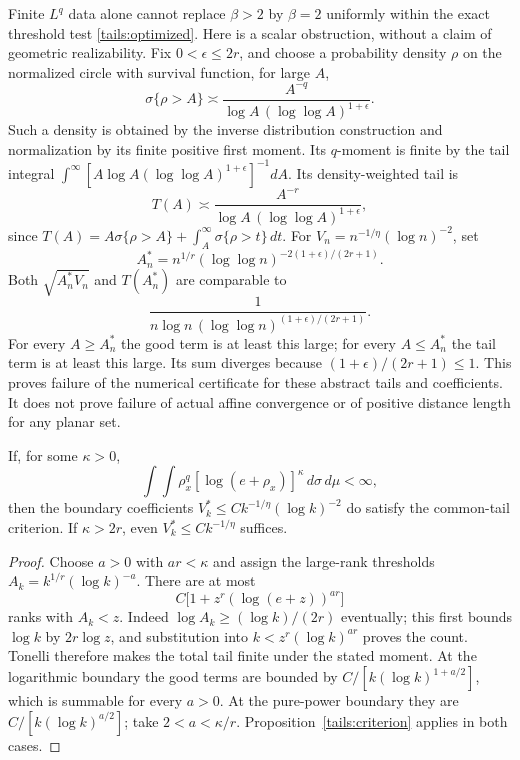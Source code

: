 \begin{remark}
\label{tails:boundary}
Finite \(L^q\) data alone cannot replace \(\beta>2\) by
\(\beta=2\) uniformly within the exact threshold test
\eqref{tails:optimized}. Here is a scalar obstruction, without a
claim of geometric realizability. Fix \(0<\epsilon\leq2r\), and
choose a probability density \(\rho\) on the normalized circle with
survival function, for large \(A\),
$$
\sigma\{\rho>A\}\asymp
\frac{A^{-q}}{\log A\,(\log\log A)^{1+\epsilon}}.
$$
Such a density is obtained by the inverse distribution construction
and normalization by its finite positive first moment. Its
\(q\)-moment is finite by the tail integral
\(\int^\infty [A\log A(\log\log A)^{1+\epsilon}]^{-1}dA\).
Its density-weighted tail is
$$
T(A)\asymp
\frac{A^{-r}}{\log A\,(\log\log A)^{1+\epsilon}},
$$
since \(T(A)=A\sigma\{\rho>A\}
+\int_A^\infty\sigma\{\rho>t\}\,dt\).
For \(V_n=n^{-1/\eta}(\log n)^{-2}\), set
$$
A_n^*=n^{1/r}
       (\log\log n)^{-2(1+\epsilon)/(2r+1)}.
$$
Both \(\sqrt{A_n^*V_n}\) and \(T(A_n^*)\) are comparable to
$$
\frac1{n\log n\,(\log\log n)^{(1+\epsilon)/(2r+1)}}.
$$
For every \(A\geq A_n^*\) the good term is at least this large;
for every \(A\leq A_n^*\) the tail term is at least this large.
Its sum diverges because \((1+\epsilon)/(2r+1)\leq1\).
This proves failure of the numerical certificate for these abstract
tails and coefficients. It does not prove failure of actual affine
convergence or of positive distance length for any planar set.
\end{remark}

\begin{proposition}
\label{tails:log-moment}
If, for some \(\kappa>0\),
$$
\int\!\int\rho_x^q[\log(e+\rho_x)]^\kappa
                         \,d\sigma\,d\mu<\infty,
$$
then the boundary coefficients
\(V_k^*\leq Ck^{-1/\eta}(\log k)^{-2}\) do satisfy
the common-tail criterion. If \(\kappa>2r\), even
\(V_k^*\leq Ck^{-1/\eta}\) suffices.
\end{proposition}
\begin{proof}
Choose \(a>0\) with \(ar<\kappa\) and assign the large-rank
thresholds \(A_k=k^{1/r}(\log k)^{-a}\). There are at most
$$
C\bigl[1+z^r(\log(e+z))^{ar}\bigr]
$$
ranks with \(A_k<z\). Indeed \(\log A_k\geq(\log k)/(2r)\)
eventually; this first bounds \(\log k\) by \(2r\log z\), and
substitution into \(k<z^r(\log k)^{ar}\) proves the count.
Tonelli therefore makes the total tail finite under the stated
moment. At the logarithmic boundary the good terms are bounded by
\(C/[k(\log k)^{1+a/2}]\), which is summable for every \(a>0\).
At the pure-power boundary they are
\(C/[k(\log k)^{a/2}]\); take \(2<a<\kappa/r\).
Proposition~\ref{tails:criterion} applies in both cases.
\end{proof}
